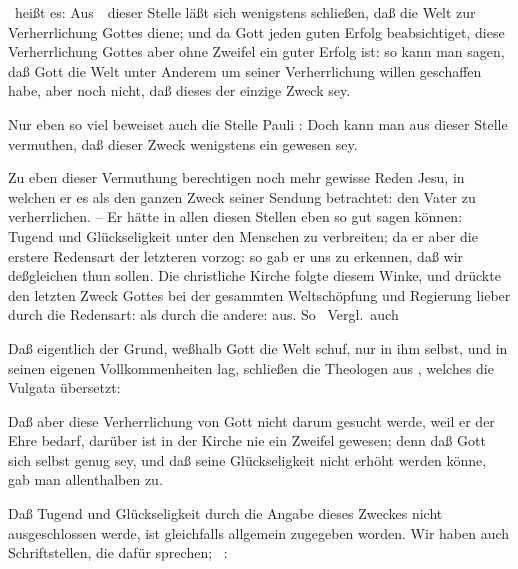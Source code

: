 \begin{aufza}
\item {}\ heißt es:  Aus~\ dieser Stelle läßt sich wenigstens schließen, daß die Welt zur Verherrlichung Gottes diene; und da Gott jeden guten Erfolg beabsichtiget, diese Verherrlichung Gottes aber ohne Zweifel ein guter Erfolg ist: so kann man sagen, daß Gott die Welt unter Anderem  um seiner Verherrlichung willen geschaffen habe, aber noch nicht, daß dieses der einzige Zweck sey.
\item Nur eben so viel beweiset auch die Stelle Pauli :  Doch kann man aus dieser Stelle vermuthen, daß dieser Zweck wenigstens ein  gewesen sey.
\item Zu eben dieser Vermuthung berechtigen noch mehr gewisse Reden Jesu, in welchen er es als den ganzen Zweck seiner Sendung betrachtet: den Vater zu verherrlichen. -- Er hätte in allen diesen Stellen eben so gut sagen können: Tugend und Glückseligkeit unter den Menschen zu verbreiten; da er aber die erstere Redensart der letzteren vorzog: so gab er uns zu erkennen, daß wir deßgleichen thun sollen. Die christliche Kirche folgte diesem Winke, und drückte den letzten Zweck Gottes bei der gesammten Weltschöpfung und Regierung lieber durch die Redensart:  als durch die andere:  aus. So \ Vergl.\ auch \ \ \ \ua
\item Daß eigentlich der Grund, weßhalb Gott die Welt schuf, nur in ihm selbst, und in seinen eigenen Vollkommenheiten lag, schließen die Theologen aus , welches die Vulgata übersetzt: 
\item Daß aber diese Verherrlichung von Gott nicht darum gesucht werde, weil er der Ehre  bedarf, darüber ist in der Kirche nie ein Zweifel gewesen; denn daß Gott sich selbst genug sey, und daß seine Glückseligkeit nicht erhöht werden könne, gab man allenthalben zu.~
\item Daß Tugend und Glückseligkeit durch die Angabe dieses Zweckes nicht ausgeschlossen werde, ist gleichfalls allgemein zugegeben worden. Wir haben auch Schriftstellen, die dafür sprechen; \zB\ : 
\end{aufza}

